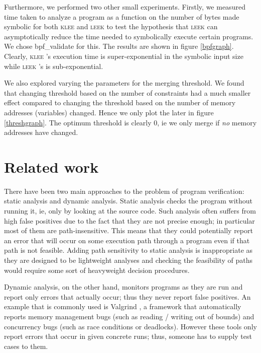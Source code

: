 \documentclass[12pt,a4paper]{article}
\newcommand{\klee}{\textsc{klee }}
\newcommand{\leek}{\textsc{leek }}
\begin{document}
Furthermore, we performed two other small experiments. Firstly, we measured time taken to analyze a program as a function on the number of bytes made symbolic for both \klee and \leek to test the hypothesis that \leek can asymptotically reduce the time needed to symbolically execute certain programs. We chose bpf\_validate for this. The results are shown in figure \ref{bpfgraph}. Clearly, \klee's execution time is super-exponential in the symbolic input size while \leek's is sub-exponential.

We also explored varying the parameters for the merging threshold. We found that changing threshold based on the number of constraints had a much smaller effect compared to changing the threshold based on the number of memory addresses (variables) changed. Hence we only plot the later in figure \ref{threshgraph}. The optimum threshold is clearly 0, ie we only merge if \emph{no} memory addresses have changed.

\section*{Related work}\label{related}
There have been two main approaches to the problem of program verification: static analysis \cite{MC} and dynamic analysis. Static analysis checks the program without running it, ie, only by looking at the source code. Such analysis often suffers from high false positives due to the fact that they are not precise enough; in particular most of them are path-insensitive. This means that they could potentially report an error that will occur on some execution path through a program even if that path is not feasible. Adding path sensitivity to static analysis is inappropriate as they are designed to be lightweight analyses and checking the feasibility of paths would require some sort of heavyweight decision procedures.

Dynamic analysis, on the other hand, monitors programs as they are run and report only errors that actually occur; thus they never report false positives. An example that is commonly used is Valgrind \cite{valgrind}, a framework that automatically reports memory management bugs (such as reading / writing out of bounds) and concurrency bugs (such as race conditions or deadlocks). However these tools only report errors that occur in given concrete runs; thus, someone has to supply test cases to them.
\end{document}
